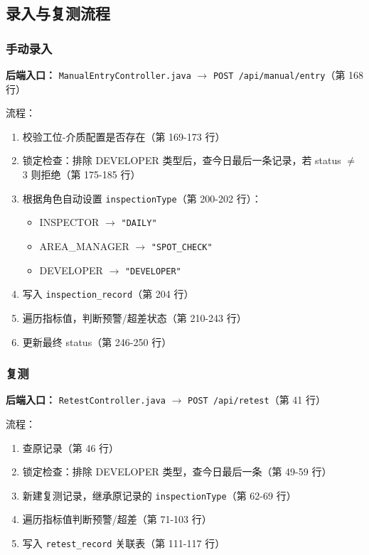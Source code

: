 \documentclass[12pt,a4paper]{ctexart}
\begin{document}
\subsection{录入与复测流程}

\subsubsection{手动录入}

\textbf{后端入口：} \texttt{ManualEntryController.java} $\rightarrow$ \texttt{POST /api/manual/entry}（第 168 行）

流程：
\begin{enumerate}
    \item 校验工位-介质配置是否存在（第 169-173 行）
    \item 锁定检查：排除 DEVELOPER 类型后，查今日最后一条记录，若 status $\neq$ 3 则拒绝（第 175-185 行）
    \item 根据角色自动设置 \texttt{inspectionType}（第 200-202 行）：
    \begin{itemize}
        \item INSPECTOR $\rightarrow$ \texttt{"DAILY"}
        \item AREA\_MANAGER $\rightarrow$ \texttt{"SPOT\_CHECK"}
        \item DEVELOPER $\rightarrow$ \texttt{"DEVELOPER"}
    \end{itemize}
    \item 写入 \texttt{inspection\_record}（第 204 行）
    \item 遍历指标值，判断预警/超差状态（第 210-243 行）
    \item 更新最终 status（第 246-250 行）
\end{enumerate}

\subsubsection{复测}

\textbf{后端入口：} \texttt{RetestController.java} $\rightarrow$ \texttt{POST /api/retest}（第 41 行）

流程：
\begin{enumerate}
    \item 查原记录（第 46 行）
    \item 锁定检查：排除 DEVELOPER 类型，查今日最后一条（第 49-59 行）
    \item 新建复测记录，继承原记录的 \texttt{inspectionType}（第 62-69 行）
    \item 遍历指标值判断预警/超差（第 71-103 行）
    \item 写入 \texttt{retest\_record} 关联表（第 111-117 行）
\end{enumerate}
\end{document}
